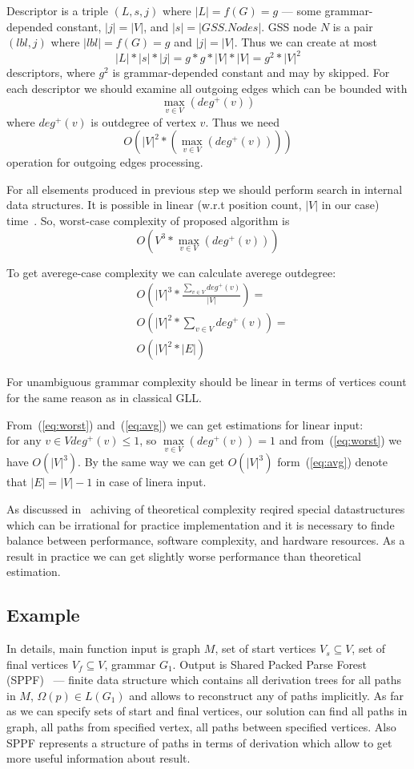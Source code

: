 \documentclass{sig-alternate} %
\begin{document}
Descriptor is a triple $(L, s, j)$ where $|L| = f(G) = g$ --- some grammar-depended constant, $|j| = |V|$, and $|s| = |GSS.Nodes|$.
GSS node $N$ is a pair $(lbl, j)$ where $|lbl| = f(G) = g$ and $|j| = |V|$. 
Thus we can create at most $$|L|*|s|*|j| = g * g * |V| * |V| = g^2*|V|^2$$ descriptors, where $g^2$ is grammar-depended constant and may by skipped.
For each descriptor we should examine all outgoing edges which can be bounded with $$\max\limits_{v \in V}(deg^+(v))$$  where $deg^+(v)$ is outdegree of vertex $v$.
Thus we need $$O(|V|^2*(\max\limits_{v \in V}(deg^+(v))))$$ operation for outgoing edges processing.

For all elsements produced in previous step we should perform search in internal data structures. It is possible in linear (w.r.t position count, $|V|$ in our case) time~\cite{modellingGLL}.
So, worst-case complexity of proposed algorithm is 
\begin{equation} \label{eq:worst}
O(V^3*\max\limits_{v \in V}(deg^+(v)))
\end{equation}

To get averege-case complexity we can calculate averege outdegree:
\begin{align} \label{eq:avg}
  & O\left(|V|^3*\frac {\sum\limits_{v \in V} deg^+(v)}{|V|}\right) = \\
  & O\left(|V|^2*\sum\limits_{v \in V} deg^+(v)\right) = \\
  & O\left(|V|^2*|E|\right) 
\end{align}

For unambiguous grammar complexity should be linear in terms of vertices count for the same reason as in classical GLL.

From~(\ref{eq:worst}) and~(\ref{eq:avg}) we can get estimations for linear input: $\text{for any } v \in V deg^+(v) \leq 1$, so $\max\limits_{v \in V}(deg^+(v))  = 1 $ and from~(\ref{eq:worst}) we have $O(|V|^3)$. 
By the same way we can get $O(|V|^3)$ form~(\ref{eq:avg}) denote that $|E| = |V| - 1$ in case of linera input. 

As discussed in~\cite{modellingGLL} achiving of theoretical complexity reqired special datastructures which can be irrational for practice implementation and it is necessary to finde balance between performance, software complexity, and hardware resources.
As a result in practice we can get slightly worse performance than theoretical estimation.

\subsection{Example}
In details, main function input is graph $M$, set of start vertices $V_s\subseteq V$, set of final vertices $V_f\subseteq V$, grammar $G_1$.
Output is Shared Packed Parse Forest (SPPF)~\cite{SPPF} --- finite data structure which contains all derivation trees for all paths in $M$, $\Omega(p) \in L(G_1)$ and allows to reconstruct any of paths implicitly.
As far as we can specify sets of start and final vertices, our solution can find all paths in graph, all paths from specified vertex, all paths between specified vertices. 
Also SPPF represents a structure of paths in terms of derivation which allow to get more useful information about result.
\end{document}
